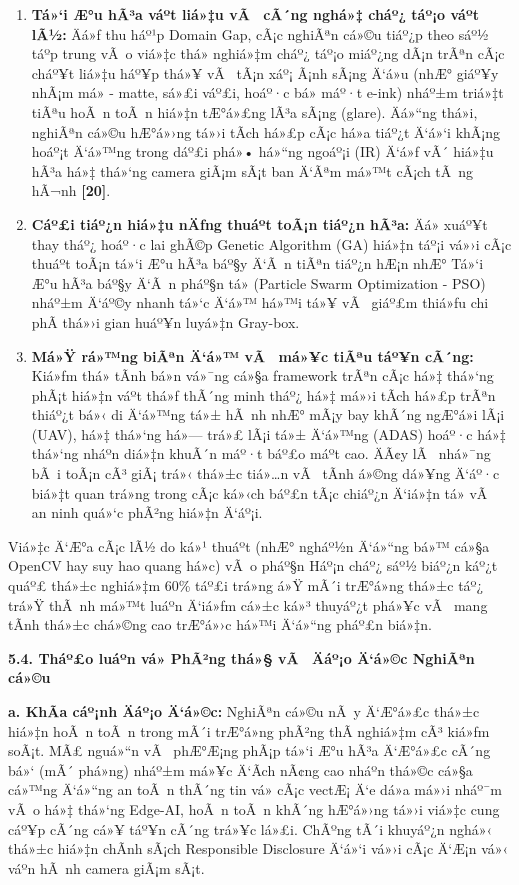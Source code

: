 \documentclass[]{article}
\begin{document}
\begin{enumerate}
\def\labelenumi{\arabic{enumi}.}
\item
  \textbf{Tá»‘i Æ°u hÃ³a váº­t liá»‡u vÃ  cÃ´ng nghá»‡ cháº¿ táº¡o váº­t lÃ½:} Äá»ƒ thu háº¹p
  Domain Gap, cÃ¡c nghiÃªn cá»©u tiáº¿p theo sáº½ táº­p trung
  vÃ o viá»‡c thá»­ nghiá»‡m cháº¿ táº¡o miáº¿ng dÃ¡n trÃªn cÃ¡c cháº¥t liá»‡u háº¥p thá»¥ vÃ 
  tÃ¡n xáº¡ Ã¡nh sÃ¡ng Ä‘á»u (nhÆ° giáº¥y nhÃ¡m má» - matte, sá»£i váº£i, hoáº·c bá» máº·t
  e-ink) nháº±m triá»‡t tiÃªu hoÃ n toÃ n hiá»‡n tÆ°á»£ng lÃ³a sÃ¡ng (glare). Äá»“ng
  thá»i, nghiÃªn cá»©u hÆ°á»›ng tá»›i tÃ­ch há»£p cÃ¡c há»a tiáº¿t Ä‘á»‘i khÃ¡ng hoáº¡t Ä‘á»™ng
  trong dáº£i phá»• há»“ng ngoáº¡i (IR) Ä‘á»ƒ vÃ´ hiá»‡u hÃ³a há»‡ thá»‘ng camera giÃ¡m sÃ¡t
  ban Ä‘Ãªm má»™t cÃ¡ch tÃ ng hÃ¬nh \textbf{{[}20{]}}.
\item
  \textbf{Cáº£i tiáº¿n hiá»‡u nÄƒng thuáº­t toÃ¡n tiáº¿n hÃ³a:} Äá» xuáº¥t thay tháº¿ hoáº·c
  lai ghÃ©p Genetic Algorithm (GA) hiá»‡n táº¡i vá»›i cÃ¡c thuáº­t toÃ¡n tá»‘i Æ°u hÃ³a
  báº§y Ä‘Ã n tiÃªn tiáº¿n hÆ¡n nhÆ° Tá»‘i Æ°u hÃ³a báº§y Ä‘Ã n pháº§n tá»­ (Particle Swarm
  Optimization - PSO) nháº±m Ä‘áº©y nhanh tá»‘c Ä‘á»™ há»™i tá»¥ vÃ  giáº£m thiá»ƒu chi phÃ­
  thá»›i gian huáº¥n luyá»‡n Gray-box.
\item
  \textbf{Má»Ÿ rá»™ng biÃªn Ä‘á»™ vÃ  má»¥c tiÃªu táº¥n cÃ´ng:} Kiá»ƒm thá»­ tÃ­nh bá»n vá»¯ng
  cá»§a framework trÃªn cÃ¡c há»‡ thá»‘ng phÃ¡t hiá»‡n
  váº­t thá»ƒ thÃ´ng minh tháº¿ há»‡ má»›i tÃ­ch há»£p trÃªn thiáº¿t bá»‹ di Ä‘á»™ng tá»± hÃ nh
  nhÆ° mÃ¡y bay khÃ´ng ngÆ°á»i lÃ¡i (UAV), há»‡ thá»‘ng há»— trá»£ lÃ¡i tá»± Ä‘á»™ng (ADAS)
  hoáº·c há»‡ thá»‘ng nháº­n diá»‡n khuÃ´n máº·t báº£o máº­t cao. ÄÃ¢y lÃ  nhá»¯ng bÃ i toÃ¡n
  cÃ³ giÃ¡ trá»‹ thá»±c tiá»…n vÃ  tÃ­nh á»©ng dá»¥ng Ä‘áº·c biá»‡t quan trá»ng trong cÃ¡c
  ká»‹ch báº£n tÃ¡c chiáº¿n Ä‘iá»‡n tá»­ vÃ  an ninh quá»‘c phÃ²ng hiá»‡n Ä‘áº¡i.
\end{enumerate}

Viá»‡c Ä‘Æ°a cÃ¡c lÃ½ do ká»¹ thuáº­t (nhÆ° ngháº½n Ä‘á»“ng bá»™ cá»§a OpenCV hay suy hao
quang há»c) vÃ o pháº§n Háº¡n cháº¿ sáº½ biáº¿n káº¿t quáº£ thá»±c nghiá»‡m 60\% táº£i trá»ng á»Ÿ
mÃ´i trÆ°á»ng thá»±c táº¿ trá»Ÿ thÃ nh má»™t luáº­n Ä‘iá»ƒm cá»±c ká»³ thuyáº¿t phá»¥c vÃ  mang
tÃ­nh thá»±c chá»©ng cao trÆ°á»›c há»™i Ä‘á»“ng pháº£n biá»‡n.

\textbf{5.4. Tháº£o luáº­n vá» PhÃ²ng thá»§ vÃ  Äáº¡o Ä‘á»©c NghiÃªn cá»©u}

\textbf{a. KhÃ­a cáº¡nh Äáº¡o Ä‘á»©c:} NghiÃªn cá»©u nÃ y
Ä‘Æ°á»£c thá»±c hiá»‡n hoÃ n toÃ n trong mÃ´i trÆ°á»ng phÃ²ng thÃ­ nghiá»‡m cÃ³ kiá»ƒm soÃ¡t.
MÃ£ nguá»“n vÃ  phÆ°Æ¡ng phÃ¡p tá»‘i Æ°u hÃ³a Ä‘Æ°á»£c cÃ´ng bá»‘ (mÃ´ phá»ng) nháº±m má»¥c Ä‘Ã­ch
nÃ¢ng cao nháº­n thá»©c cá»§a cá»™ng Ä‘á»“ng an toÃ n thÃ´ng tin vá» cÃ¡c vectÆ¡ Ä‘e dá»a
má»›i nháº¯m vÃ o há»‡ thá»‘ng Edge-AI, hoÃ n toÃ n khÃ´ng hÆ°á»›ng tá»›i viá»‡c cung cáº¥p
cÃ´ng cá»¥ táº¥n cÃ´ng trá»¥c lá»£i. ChÃºng tÃ´i khuyáº¿n nghá»‹ thá»±c hiá»‡n chÃ­nh sÃ¡ch
Responsible Disclosure Ä‘á»‘i vá»›i cÃ¡c Ä‘Æ¡n vá»‹ váº­n hÃ nh camera giÃ¡m sÃ¡t.
\end{document}
